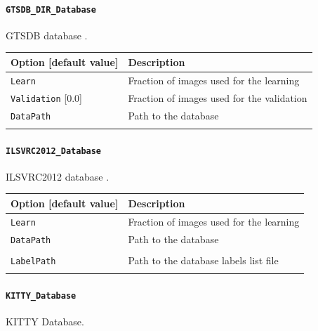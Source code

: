 \documentclass[a4paper,11pt,oneside]{article}
\begin{document}
\paragraph{\texorpdfstring{%
\lstinline[basicstyle=\ttfamily\bfseries]!GTSDB_DIR_Database!}
{GTSDB\_DIR\_Database}}
GTSDB database \citep{Houben2013}.

\begin{center}
 \begin{tabular}{| p{5cm} | p{10cm} | }
 \hline
 Option [default value] & Description\\
 \hline\hline
  \lstinline!Learn! & Fraction of images used for the learning \\
  \lstinline!Validation! [0.0] & Fraction of images used for the validation \\
  \lstinline!DataPath! & Path to the database \\
   & \\
 \hline
\end{tabular}
\end{center}


\paragraph{\texorpdfstring{%
\lstinline[basicstyle=\ttfamily\bfseries]!ILSVRC2012_Database!}
{ILSVRC2012\_Database}}
ILSVRC2012 database \citep{ILSVRC15}.

\begin{center}
 \begin{tabular}{| p{5cm} | p{10cm} | }
 \hline
 Option [default value] & Description\\
 \hline\hline
  \cellcolor{requiredcolor}
  \lstinline!Learn! & Fraction of images used for the learning \\
  \lstinline!DataPath! & Path to the database \\
   & \\
  \lstinline!LabelPath! & Path to the database labels list file \\
  \noindent [\lstinline!$N2D2_DATA!/ILSVRC2012/synsets.txt] & \\
 \hline
\end{tabular}
\end{center}

\paragraph{\texorpdfstring{%
\lstinline[basicstyle=\ttfamily\bfseries]!KITTY_Database!}{KITTY\_Database}}
KITTY Database.
\end{document}
